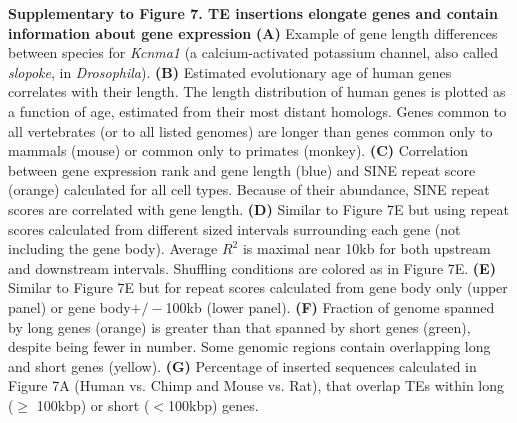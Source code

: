\textbf{Supplementary to Figure 7. TE insertions elongate genes and contain information about gene expression}
\textbf{(A)} Example of gene length differences between species for \textit{Kcnma1} (a calcium-activated potassium channel, also called \textit{slopoke}, in \textit{Drosophila}). 
\textbf{(B)} Estimated evolutionary age of human genes correlates with their length. The length distribution of human genes is plotted as a function of age, estimated from their most distant homologs. Genes common to all vertebrates (or to all listed genomes) are longer than genes common only to mammals (mouse) or common only to primates (monkey).
\textbf{(C)} Correlation between gene expression rank and gene length (blue) and SINE repeat score (orange) calculated for all cell types. Because of their abundance, SINE repeat scores are correlated with gene length.
\textbf{(D)} Similar to Figure 7E but using repeat scores calculated from different sized intervals surrounding each gene (not including the gene body). Average $R^2$ is maximal near 10kb for both upstream and downstream intervals. Shuffling conditions are colored as in Figure 7E.
\textbf{(E)} Similar to Figure 7E but for repeat scores calculated from gene body only (upper panel) or gene body$+/-$100kb (lower panel).
\textbf{(F)} Fraction of genome spanned by long genes (orange) is greater than that spanned by short genes (green), despite being fewer in number. Some genomic regions contain overlapping long and short genes (yellow).
\textbf{(G)} Percentage of inserted sequences calculated in Figure 7A (Human vs. Chimp and Mouse vs. Rat), that overlap TEs within long ($\geq$ 100kbp) or short ($<$100kbp) genes. 